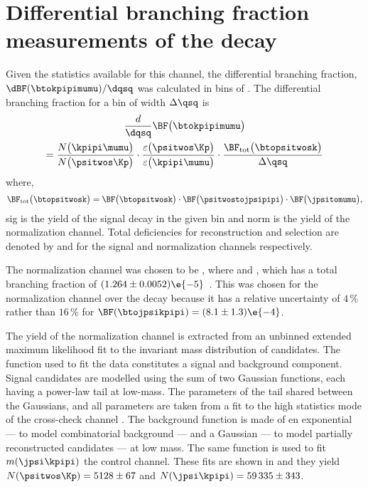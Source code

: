 \section[Differential branching fraction measurements of the decay \btokpipimumu]
{Differential branching fraction measurements of the decay \tmath{\btokpipimumu}}

Given the statistics available for this channel, the differential branching fraction,
$\dBF(\btokpipimumu)/\dqsq$ was calculated in bins of \qsq.
The differential branching fraction for a bin of width $\Delta\qsq$ is
\begin{multline}
  \frac{d}{\dqsq}\BF\big(\btokpipimumu\big)
  \\=
  \frac{N\big(\kpipi\mumu\big)}{N\big(\psitwos\Kp\big)} \cdot
  \frac{\varepsilon\big(\psitwos\Kp\big)}{\varepsilon\big(\kpipi\mumu\big)} \cdot
  \frac{\BF_\mathrm{tot}\big(\btopsitwosk\big)}{\Delta\qsq}
  \label{eq:kpipi:diffbf}
\end{multline}
where,
\begin{equation*}
  \BF_\mathrm{tot}\big(\btopsitwosk\big)
  =
  \BF\big(\btopsitwosk\big) \cdot
  \BF\big(\psitwostojpsipipi\big) \cdot
  \BF\big(\jpsitomumu\big),
\end{equation*}
\num{sig} is the yield of the signal decay \btokpipimumu in the given \qsq bin and \num{norm}
is the yield of the normalization channel.
Total deficiencies for reconstruction and selection are denoted by  and  for the
signal and normalization channels respectively.

The normalization channel was chosen to be \btopsitwosk, where \psitwostojpsipipi and \jpsitomumu,
which has a total branching fraction of $(1.264 \pm 0.0052)\e{-5}$~\cite{PDG2012}.
This was chosen for the normalization channel over the decay \btojpsikpipi because it has a
relative uncertainty of $4\,\%$ rather than $16\,\%$ for $\BF(\btojpsikpipi) = (8.1\pm1.3)\e{-4}$.

The yield  of the normalization channel is extracted from an unbinned extended maximum likelihood
fit to the invariant mass distribution of \btopsitwosk candidates.
The function used to fit the data constitutes a signal and background component.
Signal candidates are modelled using the sum of two Gaussian functions, each having a power-law
tail at low-mass.
The parameters of the tail shared between the Gaussians, and all parameters are taken from a fit to
the high statistics mode of the cross-check channel \btojpsikpipi.
The background function is made of en exponential --- to model combinatorial background --- and a
Gaussian --- to model partially reconstructed candidates --- at low mass.
The same function is used to fit $m(\jpsi\kpipi)$ the control channel.
These fits are shown in  and they yield
$N(\psitwos\Kp)=5128\pm67$ and $N(\jpsi\kpipi)=59\,335\pm343$.

